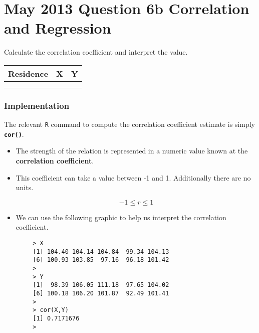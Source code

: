 \documentclass[]{report}
\begin{document}
\section*{May 2013 Question 6b Correlation and Regression }
Calculate the correlation coefficient and interpret the value.
\begin{tabular}{|c|c|c|}
	\hline Residence	& X	  & Y \\ 
	\hline  &  &  \\ 
	\hline  &  &  \\ 
	\hline 
\end{tabular} 


\subsubsection*{Implementation}
The relevant \texttt{R} command to compute the correlation coefficient estimate is simply \texttt{\textbf{cor()}}.

%
%



\begin{itemize}
	\item The strength of the relation is represented in a numeric value known at the \textbf{correlation coefficient}. 
	\item This coefficient can take a value between -1 and 1. Additionally there are no units.
	
	\[ -1 \leq r \leq 1\]
	
	\item We can use the following graphic to help us interpret the correlation coefficient.
\end{itemize}
{
	
	\begin{framed}
		\begin{verbatim}
		> X
		[1] 104.40 104.14 104.84  99.34 104.13
		[6] 100.93 103.85  97.16  96.18 101.42
		> 
		> Y
		[1]  98.39 106.05 111.18  97.65 104.02
		[6] 100.18 106.20 101.87  92.49 101.41
		> 
		> cor(X,Y)
		[1] 0.7171676
		> 
		
		\end{verbatim}
	\end{framed}
}
\end{document}
